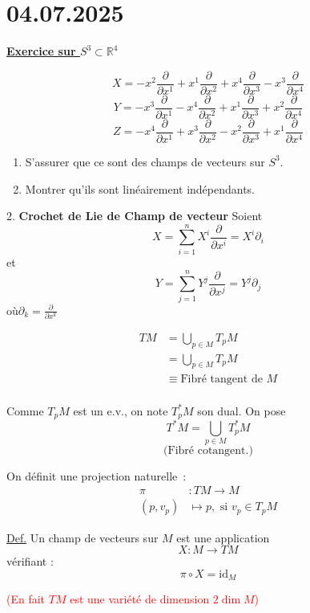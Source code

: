 \documentclass[11pt,a4paper]{article}
\begin{document}
	\section{04.07.2025}
	\underline{\textbf{Exercice sur $S^3 \subset \mathbb{R}^4$}}
	
	\[
	X = -x^2 \frac{\partial}{\partial x^1} + x^1 \frac{\partial}{\partial x^2} + x^4 \frac{\partial}{\partial x^3} - x^3 \frac{\partial}{\partial x^4}
	\]
	\[
	Y = -x^3 \frac{\partial}{\partial x^1} - x^4 \frac{\partial}{\partial x^2} + x^1 \frac{\partial}{\partial x^3} + x^2 \frac{\partial}{\partial x^4}
	\]
	\[
	Z = -x^4 \frac{\partial}{\partial x^1} + x^3 \frac{\partial}{\partial x^2} - x^2 \frac{\partial}{\partial x^3} + x^1 \frac{\partial}{\partial x^4}
	\]
	
	\begin{enumerate}
		\item S'assurer que ce sont des champs de vecteurs sur $S^3$.
		\item Montrer qu'ils sont linéairement indépendants.
	\end{enumerate}
	

2. \textbf{Crochet de Lie de Champ de vecteur}
Soient 
\[
X = \sum_{i=1}^{n} X^i \frac{\partial}{\partial x^i} = X^i \partial_i
\]
et
\[
Y = \sum_{j=1}^{n} Y^j \frac{\partial}{\partial x^j} = Y^j \partial_j
\]
où\quad $\partial_k = \frac{\partial}{\partial x^k}$
	
	
\begin{align*}
	TM &= \bigcup_{p \in M} T_pM \\ 
	&= \left. \bigcup_{p \in M} T_pM \right. \\ 
		&\equiv \text{Fibré tangent de } M\\
\end{align*}

	
	Comme $T_pM$ est un e.v., on note $T_p^*M$ son dual. On pose
	\[
	T^*M = \bigcup_{p \in M} T_p^*M
	\]
	\[
	\text{(Fibré cotangent.)}
	\]

		On définit une projection naturelle~: 
	\begin{align*}
		\pi &: TM \to M \\ 
		(p, v_p) &\mapsto p, \text{ si } v_p \in T_p M
	\end{align*}
		
		\underline{Def.} Un champ de vecteurs sur $M$ est une application 
		\[
		X : M \to TM
		\]
		vérifiant :
		\[
		\pi \circ X = \mathrm{id}_M
		\]
		
		\textcolor{red}{(En fait $TM$ est une variété de dimension $2 \dim M$)}
		
\end{document}
